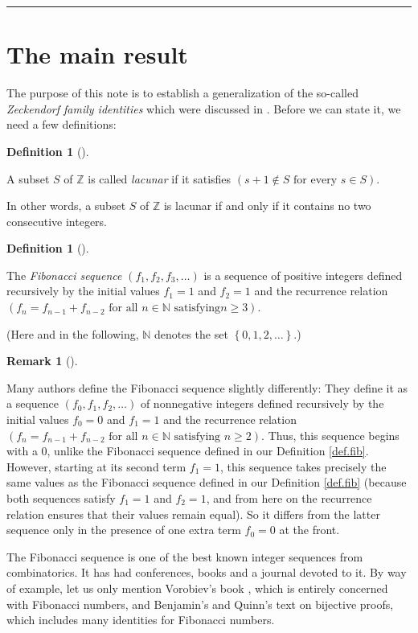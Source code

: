 \documentclass[numbers=enddot,12pt,final,onecolumn,notitlepage]{scrartcl}%
\numberwithin{exer}{section}
\theoremstyle{definition}
\newtheorem{defi}[theo]{Definition}
\newenvironment{definition}[1][]
{\begin{defi}[#1]\begin{leftbar}}
{\end{leftbar}\end{defi}}
\newtheorem{remk}[theo]{Remark}
\newenvironment{remark}[1][]
{\begin{remk}[#1]\begin{leftbar}}
{\end{leftbar}\end{remk}}
\begin{document}
\hrule


\section{The main result}

The purpose of this note is to establish a generalization of the so-called
\textit{Zeckendorf family identities} which were discussed in \cite{1}. Before
we can state it, we need a few definitions:

\begin{definition}
A subset $S$ of $\mathbb{Z}$ is called \textit{lacunar} if it satisfies
$\left(  s+1\notin S\text{ for every }s\in S\right)  $.
\end{definition}

In other words, a subset $S$ of $\mathbb{Z}$ is lacunar if and only if it
contains no two consecutive integers.

\begin{definition}
\label{def.fib}The \textit{Fibonacci sequence} $\left(  f_{1},f_{2}%
,f_{3},\ldots\right)  $ is a sequence of positive integers defined recursively
by the initial values $f_{1}=1$ and $f_{2}=1$ and the recurrence relation
$\left(  f_{n}=f_{n-1}+f_{n-2}\text{ for all }n\in\mathbb{N}\text{ satisfying
}n\geq3\right)  $.
\end{definition}

(Here and in the following, $\mathbb{N}$ denotes the set $\left\{
0,1,2,\ldots\right\}  $.)

\begin{remark}
Many authors define the Fibonacci sequence slightly differently: They define
it as a sequence $\left(  f_{0},f_{1},f_{2},\ldots\right)  $ of nonnegative
integers defined recursively by the initial values $f_{0}=0$ and $f_{1}=1$ and
the recurrence relation $\left(  f_{n}=f_{n-1}+f_{n-2}\text{ for all }%
n\in\mathbb{N}\text{ satisfying }n\geq2\right)  $. Thus, this sequence begins
with a $0$, unlike the Fibonacci sequence defined in our Definition
\ref{def.fib}. However, starting at its second term $f_{1}=1$, this sequence
takes precisely the same values as the Fibonacci sequence defined in our
Definition \ref{def.fib} (because both sequences satisfy $f_{1}=1$ and
$f_{2}=1$, and from here on the recurrence relation ensures that their values
remain equal). So it differs from the latter sequence only in the presence of
one extra term $f_{0}=0$ at the front.
\end{remark}

The Fibonacci sequence is one of the best known integer sequences from
combinatorics. It has had conferences, books and a journal devoted to it. By
way of example, let us only mention Vorobiev's book \cite{Vorobi02}, which is
entirely concerned with Fibonacci numbers, and Benjamin's and Quinn's text
\cite{BenQui03} on bijective proofs, which includes many identities for
Fibonacci numbers.
\end{document}
